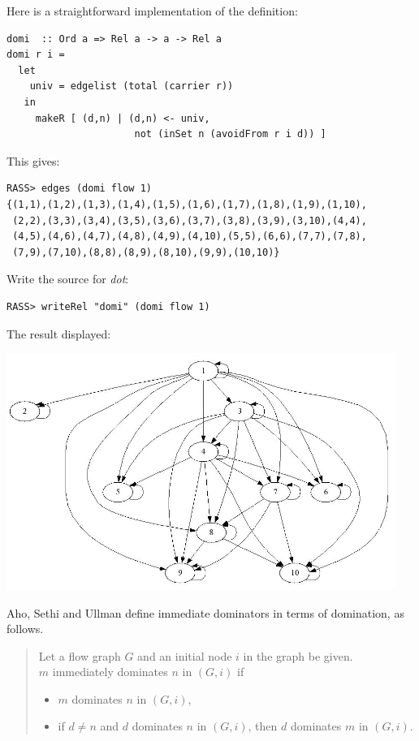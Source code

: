 \documentclass[11pt]{article}
\newlength{\fminilength}
\newenvironment{fminipage}[1][\linewidth]
 {\setlength{\fminilength}{#1-2\fboxsep-2\fboxrule-1em}%
  \bigskip\begin{lrbox}{\fminibox}\quad\begin{minipage}{\fminilength}\bigskip}
 {\smallskip\end{minipage}\end{lrbox}\noindent\fbox{\usebox{\fminibox}}\bigskip}
\newcommand{\bc}{\begin{fminipage}}
\newcommand{\ec}{\end{fminipage}}
\begin{document}
Here is a straightforward implementation of the definition:

\bc\begin{verbatim} 
domi  :: Ord a => Rel a -> a -> Rel a
domi r i = 
  let  
    univ = edgelist (total (carrier r))
   in 
     makeR [ (d,n) | (d,n) <- univ, 
                      not (inSet n (avoidFrom r i d)) ]
\end{verbatim}\ec

This gives: 

\begin{verbatim}
RASS> edges (domi flow 1)
{(1,1),(1,2),(1,3),(1,4),(1,5),(1,6),(1,7),(1,8),(1,9),(1,10),
 (2,2),(3,3),(3,4),(3,5),(3,6),(3,7),(3,8),(3,9),(3,10),(4,4),
 (4,5),(4,6),(4,7),(4,8),(4,9),(4,10),(5,5),(6,6),(7,7),(7,8),
 (7,9),(7,10),(8,8),(8,9),(8,10),(9,9),(10,10)}
\end{verbatim}

Write the source for {\em dot}\/: 

\begin{verbatim}
RASS> writeRel "domi" (domi flow 1)
\end{verbatim} 

The result displayed: 

\begin{center}
\includegraphics[width=5in]{domi}
\end{center}

Aho, Sethi and Ullman define immediate dominators in terms of
domination, as follows.

\begin{quote} 
 Let a flow graph $G$ and an initial node $i$ in the graph be given. \\
 $m$ immediately dominates $n$ in $(G,i)$ if 
  \begin{itemize}   
    \item $m$ dominates $n$ in $(G,i)$, 
    \item if $d \neq n$ and $d$ dominates $n$ in $(G,i)$, 
          then $d$ dominates $m$ in $(G,i)$. 
  \end{itemize} 
\end{quote}
\end{document}
